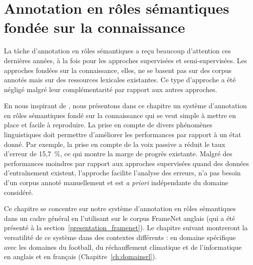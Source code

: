 \chapter{Annotation en rôles sémantiques fondée sur la connaissance}
\label{ch:srl}




La tâche d'annotation en rôles sémantiques a reçu beaucoup d'attention ces
dernières années, à la fois pour les approches supervisées et semi-supervisées.
Les approches fondées sur la connaissance, elles, ne se basent pas sur des
corpus annotés mais sur des ressources lexicales existantes. Ce type d'approche
a été négligé malgré leur complémentarité par rapport aux autres approches.

En nous inspirant de \citep{swier2004unsupervised,swier2005exploiting}, nous
présentons dans ce chapitre un système d'annotation en rôles sémantiques fondé
sur la connaissance qui se veut simple à mettre en place et facile à
reproduire. La prise en compte de divers phénomènes linguistiques doit
permettre d'améliorer les performances par rapport à un état donné. Par
exemple, la prise en compte de la voix passive a réduit le taux d'erreur de
15,7~\%, ce qui montre la marge de progrès existante. Malgré des performances
moindres par rapport aux approches supervisées quand des données d'entraînement
existent, l'approche facilite l'analyse des erreurs, n'a pas besoin d'un corpus
annoté manuellement et est \emph{a priori} indépendante du domaine considéré.

Ce chapitre se concentre sur notre système d'annotation en rôles sémantiques
dans un cadre général en l'utilisant sur le corpus FrameNet anglais (qui a été
présenté à la section~\ref{presentation_framenet}). Le chapitre suivant
montreront la versatilité de ce système dans des contextes différents : en
domaine spécifique avec les domaines du football, du réchauffement climatique
et de l'informatique en anglais et en français (Chapitre~\ref{ch:domainsrl}).

